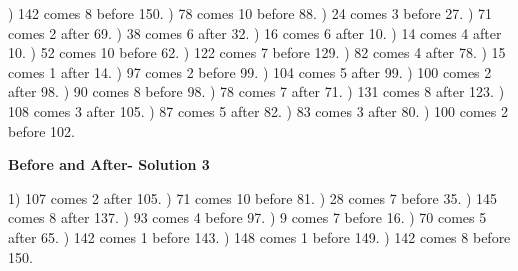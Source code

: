 \documentclass{article}%
\begin{document}
) 142 comes 8 before 150.%
) 78 comes 10 before 88.%
) 24 comes 3 before 27.%
) 71 comes 2 after 69.%
) 38 comes 6 after 32.%
) 16 comes 6 after 10.%
) 14 comes 4 after 10.%
) 52 comes 10 before 62.%
) 122 comes 7 before 129.%
) 82 comes 4 after 78.%
) 15 comes 1 after 14.%
) 97 comes 2 before 99.%
) 104 comes 5 after 99.%
) 100 comes 2 after 98.%
) 90 comes 8 before 98.%
) 78 comes 7 after 71.%
) 131 comes 8 after 123.%
) 108 comes 3 after 105.%
) 87 comes 5 after 82.%
) 83 comes 3 after 80.%
) 100 comes 2 before 102.%
\newline%
\newpage%
\large%
\begin{center}%
\textbf{Before and After- Solution 3}%
\newline%
\end{center} \normalsize%
1) 107 comes 2 after 105.%
) 71 comes 10 before 81.%
) 28 comes 7 before 35.%
) 145 comes 8 after 137.%
) 93 comes 4 before 97.%
) 9 comes 7 before 16.%
) 70 comes 5 after 65.%
) 142 comes 1 before 143.%
) 148 comes 1 before 149.%
) 142 comes 8 before 150.%
\end{document}
